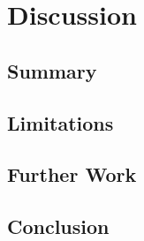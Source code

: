 \section{Discussion}
	\subsection{Summary}
	\subsection{Limitations}
	\subsection{Further Work}
	\subsection{Conclusion}
